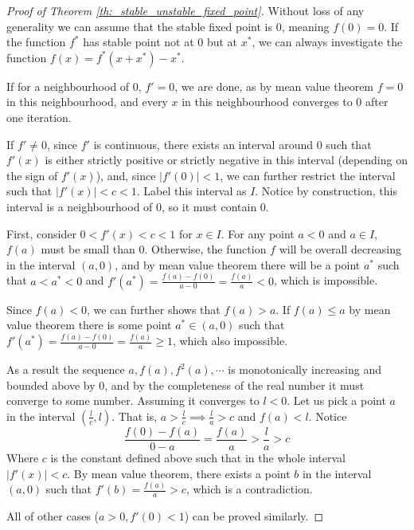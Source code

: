 \begin{proof}[Proof of Theorem \ref{th:_stable_unstable_fixed_point}]
	Without loss of any generality we can assume that the stable fixed point is $0$, meaning $f(0) = 0$. 
	If the function $f^*$ has stable point not at $0$ but at $x^*$, we can always investigate the function $f(x) = f^*(x+x^*) - x^*$. 
	
	If for a neighbourhood of $0$, $f' = 0$, we are done, as by mean value theorem $f = 0$ in this neighbourhood, and every $x$ in this neighbourhood converges to $0$ after one iteration.

	If $f' \neq 0$, since $f'$ is continuous, there exists an interval around $0$ such that $f'(x)$ is either strictly positive or strictly negative in this interval (depending on the sign of $f'(x)$), and, since $|f'(0)| < 1$, we can further restrict the interval such that $|f'(x)| < c < 1$. 
	Label this interval as $I$. 
	Notice by construction, this interval is a neighbourhood of $0$, so it must contain $0$.
	
	First, consider $0 < f'(x) < c < 1$ for $x \in I$. 
	For any point $a<0$ and $a\in I$,  $f(a)$ must be small than $0$. 
	Otherwise, the function $f$ will be overall decreasing in the interval $(a, 0)$, and by mean value theorem there will be a point $a^*$ such that $a < a^* < 0$ and $f'(a^*) = \frac{f(a) - f(0)}{a - 0} = \frac{f(a)}{a} < 0$, which is impossible.

	Since $f(a) < 0$, we can further shows that $f(a) > a$. 
	If $f(a) \leq a$ by mean value theorem there is some point $a^* \in (a, 0)$ such that $f'(a^*) = \frac{f(a) - f(0)}{a - 0} = \frac{f(a)}{a} \geq 1$, which also impossible.

	As a result the sequence $a, f(a), f^2(a), \cdots$ is monotonically increasing and bounded above by $0$, and by the completeness of the real number it must converge to some number. 
	Assuming it converges to $l < 0$. 
	Let us pick a point $a$ in the interval $(\frac{l}{c}, l)$. 
	That is, $a > \frac{l}{c} \implies \frac{l}{a} > c$ and $f(a) < l$.
	Notice 
	$$
	\frac{f(0) - f(a)}{0 - a} = \frac{f(a)}{a} > \frac{l}{a} > c
	$$
	Where $c$ is the constant defined above such that in the whole interval $|f'(x)| < c$.
	By mean value theorem, there exists a point $b$ in the interval $(a, 0)$ such that $f'(b) = \frac{f(a)}{a} > c$, which is a contradiction.

	All of other cases ($a > 0, f'(0) < 1$) can be proved similarly.
\end{proof}

